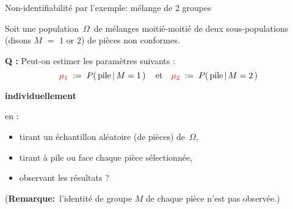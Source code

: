 \begin{frame}{\vskip -0.2cm \normalsize Non-identifiabilit\'e par l'exemple: {\large m\'elange de 2 groupes}}

\mbox{}
\vskip -0.5cm

\pause
Soit une population \,$\Omega$\, de m\'elanges moiti\'e-moiti\'e
de deux sous-populations (disons $M$ $=$ $1$ or $2$)
de pi\`eces non conformes.

\pause
\vskip 0.3cm
\textbf{Q :}\; {\color{red}Peut-on estimer} les param\`etres suivants :
\begin{equation*}
{\color{red}\mu_{1}} \;:=\; P\!\left(\,\textnormal{pile}\,\vert\,M=1\,\right)
\quad\textnormal{et}\quad
{\color{red}\mu_{2}} \;:=\; P\!\left(\,\textnormal{pile}\,\vert\,M=2\,\right)
\end{equation*}
\pause
\begin{center} \vskip-0.8cm \textbf{\Large\color{red}individuellement} \end{center}
\vskip -0.3cm
en :
\pause
\begin{itemize}
\item
	tirant un \'echantillon al\'eatoire (de pi\`eces) de \,$\Omega$,
\item
	tirant \`a pile ou face chaque pi\`ece s\'electionn\'ee,
\item
	observant les r\'esultats ?
\end{itemize}

\pause
\vskip 0.3cm
({\small\textbf{Remarque:}\, l'identit\'e de groupe $M$ de chaque pi\`ece n'est pas observ\'ee.})

\end{frame}
\normalsize

